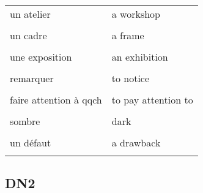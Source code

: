 \documentclass[
  10pt,
]{article}
\begin{document}
\begin{longtable}{ll}
un atelier & a workshop\\

\cellcolor{gray!6}{un conservateur de musée} & \cellcolor{gray!6}{a curator}\\

un cadre & a frame\\

\cellcolor{gray!6}{un indice} & \cellcolor{gray!6}{a clue}\\

une exposition & an exhibition\\

\cellcolor{gray!6}{exposer} & \cellcolor{gray!6}{to display}\\

remarquer & to notice\\

\cellcolor{gray!6}{perdu} & \cellcolor{gray!6}{unaccounted for}\\

faire attention à qqch & to pay attention to\\

\cellcolor{gray!6}{rendre visite à} & \cellcolor{gray!6}{to pay a visit to}\\

sombre & dark\\

\cellcolor{gray!6}{vif, éclatant} & \cellcolor{gray!6}{bright}\\

un défaut & a drawback\\

\cellcolor{gray!6}{au lieu de} & \cellcolor{gray!6}{instead of}\\
\bottomrule
\end{longtable}

\hypertarget{dn2}{%
\subsection{DN2}\label{dn2}}
\end{document}
